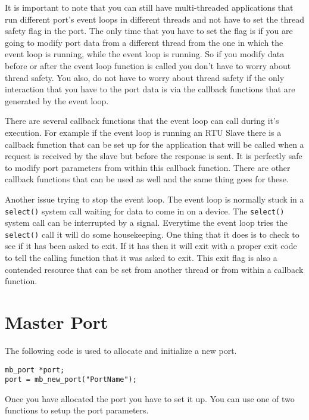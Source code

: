 \documentclass[10pt,letterpaper]{report}
\begin{document}
It is important to note that you can still have multi-threaded applications that run different port's event loops in different threads and not have to set the thread safety flag in the port.  The only time that you have to set the flag is if you are going to modify port data from a different thread from the one in which the event loop is running, while the event loop is running.  So if you modify data before or after the event loop function is called you don't have to worry about thread safety.  You also, do not have to worry about thread safety if the only interaction that you have to the port data is via the callback functions that are generated by the event loop.  

There are several callback functions that the event loop can call during it's execution.  For example if the event loop is running an RTU Slave there is a callback function that can be set up for the application that will be called when a request is received by the slave but before the response is sent.  It is perfectly safe to modify port parameters from within this callback function.  There are other callback functions that can be used as well and the same thing goes for these.  

Another issue trying to stop the event loop.  The event loop is normally stuck in a \texttt{select()} system call waiting for data to come in on a device.  The \texttt{select()} system call can be interrupted by a signal.  Everytime the event loop tries the \texttt{select()} call it will do some housekeeping.  One thing that it does is to check to see if it has been asked to exit.  If it has then it will exit with a proper exit code to tell the calling function that it was asked to exit.  This exit flag is also a contended resource that can be set from another thread or from within a callback function.


\chapter{Master Port}

The following code is used to allocate and initialize a new port.

\begin{verbatim}
mb_port *port;
port = mb_new_port("PortName");
\end{verbatim}

Once you have allocated the port you have to set it up. You can use one of two functions to setup the port parameters.
\end{document}
